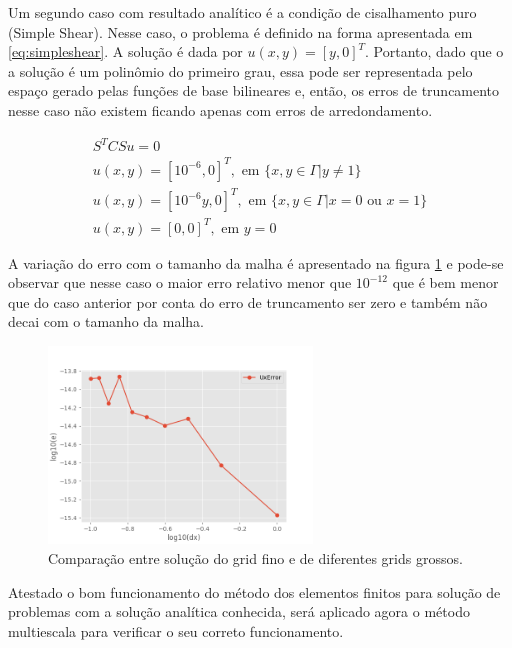    
Um segundo caso com resultado analítico é a condição de cisalhamento puro (Simple Shear). 
Nesse caso, o problema é definido na forma apresentada em \ref{eq:simpleshear}. A solução
é dada por $u(x,y) = [y, 0]^T$. Portanto, dado que o a solução é um polinômio do primeiro grau,
essa pode ser representada pelo espaço gerado pelas funções de base bilineares e, então,
os erros de truncamento nesse caso não existem ficando apenas com erros de arredondamento.

\begin{equation}\label{eq:simpleshear}
    \begin{aligned}
        S^T C S u = 0 \\
        u(x,y) = [10^{-6}, 0]^T, \text{ em } \{x, y \in \Gamma | y \neq 1\} \\
        u(x,y) = [10^{-6}y, 0]^T, \text{ em } \{x, y \in \Gamma | x = 0 \text{ ou } x = 1\} \\
        u(x,y) = [0, 0]^T, \text{ em } y=0
    \end{aligned}
\end{equation}

A variação do erro com o tamanho da malha é apresentado na figura \ref{fig:SecondErrorTestSimpleShear} e pode-se observar que nesse caso o maior erro relativo menor que $10^{-12}$ que é bem menor que do caso anterior por conta do erro de truncamento ser zero e também não decai com o tamanho da malha.

\begin{figure}[!htbp]
    \centering
    \includegraphics[width=7cm]{chap08/figs/SecondErrorTestSimpleShear.png}
    \caption{Comparação entre solução do grid fino e de diferentes grids grossos.}
    \label{fig:SecondErrorTestSimpleShear}
\end{figure}

Atestado o bom funcionamento do método dos elementos finitos para solução de problemas com a solução
analítica conhecida, será aplicado agora o método multiescala para verificar o seu correto funcionamento.

